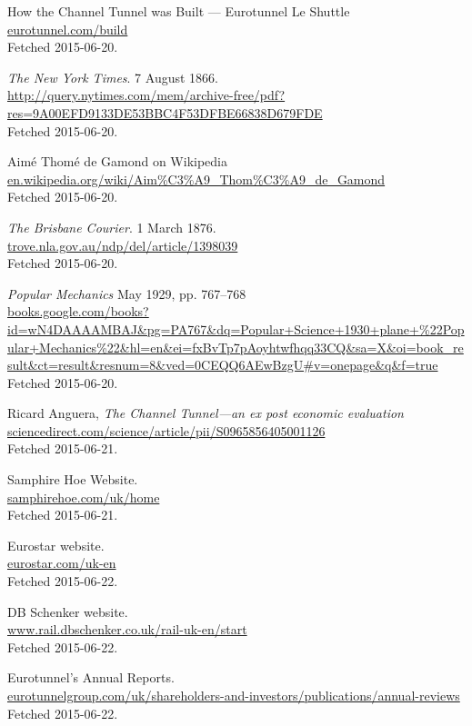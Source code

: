 \documentclass[12pt]{article} %
\begin{document}
\begin{thebibliography}{99}

	How the Channel Tunnel was Built --- Eurotunnel Le Shuttle\\
	\url{eurotunnel.com/build}\\
	Fetched 2015-06-20.

	\textit{The New York Times}. 7 August 1866.\\
	\url{http://query.nytimes.com/mem/archive-free/pdf?res=9A00EFD9133DE53BBC4F53DFBE66838D679FDE}\\
	Fetched 2015-06-20.

	Aimé Thomé de Gamond on Wikipedia\\
	\url{en.wikipedia.org/wiki/Aim%C3%A9_Thom%C3%A9_de_Gamond}\\
	Fetched 2015-06-20.

	\textit{The Brisbane Courier}. 1 March 1876.\\
	\url{trove.nla.gov.au/ndp/del/article/1398039}\\
	Fetched 2015-06-20.

	\emph{Popular Mechanics} May 1929, pp. 767--768\\
	\url{books.google.com/books?id=wN4DAAAAMBAJ&pg=PA767&dq=Popular+Science+1930+plane+%22Popular+Mechanics%22&hl=en&ei=fxBvTp7pAoyhtwfhqq33CQ&sa=X&oi=book_result&ct=result&resnum=8&ved=0CEQQ6AEwBzgU#v=onepage&q&f=true}\\
	Fetched 2015-06-20.

	Ricard Anguera, \textit{The Channel Tunnel---an ex post economic evaluation}\\
	\url{sciencedirect.com/science/article/pii/S0965856405001126}\\
	Fetched 2015-06-21.

	Samphire Hoe Website.\\
	\url{samphirehoe.com/uk/home}\\
	Fetched 2015-06-21.

	Eurostar website.\\
	\url{eurostar.com/uk-en}\\
	Fetched 2015-06-22.
	
	DB Schenker website.\\
	\url{www.rail.dbschenker.co.uk/rail-uk-en/start}\\
	Fetched 2015-06-22.

	Eurotunnel's Annual Reports.\\
	\url{eurotunnelgroup.com/uk/shareholders-and-investors/publications/annual-reviews}\\
	Fetched 2015-06-22.


\end{thebibliography}
\end{document}

